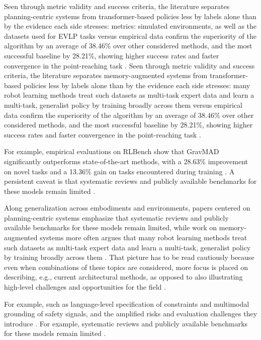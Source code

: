 \documentclass[a4paper,11pt]{article}
\begin{document}
Seen through metric validity and success criteria, the literature separates planning-centric systems from transformer-based policies less by labels alone than by the evidence each side stresses: metrics: simulated environments, as well as the datasets used for EVLP tasks versus empirical data confirm the superiority of the algorithm by an average of 38.46\% over other considered methods, and the most successful baseline by 28.21\%, showing higher success rates and faster convergence in the point-reaching task \citep{Francis2021Core,Francis2023Core,Makarova2025Conther}. Seen through metric validity and success criteria, the literature separates memory-augmented systems from transformer-based policies less by labels alone than by the evidence each side stresses: many robot learning methods treat such datasets as multi-task expert data and learn a multi-task, generalist policy by training broadly across them versus empirical data confirm the superiority of the algorithm by an average of 38.46\% over other considered methods, and the most successful baseline by 28.21\%, showing higher success rates and faster convergence in the point-reaching task \citep{Memmel2024Strap,Makarova2025Conther}.

For example, empirical evaluations on RLBench show that GravMAD significantly outperforms state-of-the-art methods, with a 28.63\% improvement on novel tasks and a 13.36\% gain on tasks encountered during training \citep{Chen2024Gravmad}. A persistent caveat is that systematic reviews and publicly available benchmarks for these models remain limited \citep{Zheng2025Multimodal}.

Along generalization across embodiments and environments, papers centered on planning-centric systems emphasize that systematic reviews and publicly available benchmarks for these models remain limited, while work on memory-augmented systems more often argues that many robot learning methods treat such datasets as multi-task expert data and learn a multi-task, generalist policy by training broadly across them \citep{Zheng2025Multimodal,Francis2021Core,Memmel2024Strap}. That picture has to be read cautiously because even when combinations of these topics are considered, more focus is placed on describing, e.g., current architectural methods, as opposed to also illustrating high-level challenges and opportunities for the field \citep{Francis2023Core}.

For example, such as language-level specification of constraints and multimodal grounding of safety signals, and the amplified risks and evaluation challenges they introduce \citep{Zhang2025Safe}. For example, systematic reviews and publicly available benchmarks for these models remain limited \citep{Zheng2025Multimodal}.
\end{document}
